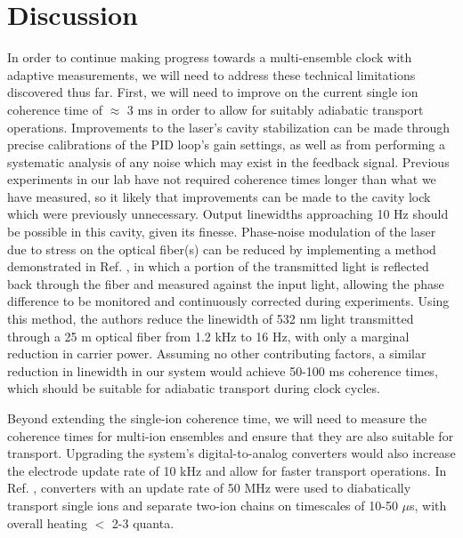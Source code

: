 \section{Discussion}


In order to continue making progress towards a multi-ensemble clock with adaptive measurements, we will need to address these technical limitations discovered thus far. First, we will need to improve on the current single ion coherence time of $\approx$ 3 ms in order to allow for suitably adiabatic transport operations. Improvements to the laser's cavity stabilization can be made through precise calibrations of the PID loop's gain settings, as well as from performing a systematic analysis of any noise which may exist in the feedback signal. Previous experiments in our lab have not required coherence times longer than what we have measured, so it likely that improvements can be made to the cavity lock which were previously unnecessary. Output linewidths approaching 10 Hz should be possible in this cavity, given its finesse. Phase-noise modulation of the laser due to stress on the optical fiber(s) can be reduced by implementing a method demonstrated in Ref. \cite{Ma:94}, in which a portion of the transmitted light is reflected back through the fiber and measured against the input light, allowing the phase difference to be monitored and continuously corrected during experiments. Using this method, the authors reduce the linewidth of 532 nm light transmitted through a 25 m optical fiber from 1.2 kHz to 16 Hz, with only a marginal reduction in carrier power. Assuming no other contributing factors, a similar reduction in linewidth in our system would achieve 50-100 ms coherence times, which should be suitable for adiabatic transport during clock cycles.

Beyond extending the single-ion coherence time, we will need to measure the coherence times for multi-ion ensembles and ensure that they are also suitable for transport. Upgrading the system's digital-to-analog converters would also increase the electrode update rate of 10 kHz and allow for faster transport operations. In Ref. \cite{PhysRevLett.109.080502}, converters with an update rate of 50 MHz were used to diabatically transport single ions and separate two-ion chains on timescales of 10-50 $\mu$s, with overall heating $<$ 2-3 quanta. 


